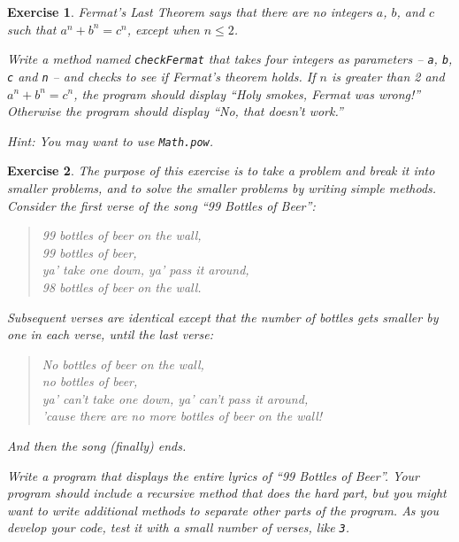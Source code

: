 \documentclass[12pt]{book}
\theoremstyle{exercise}
\newtheorem{exercise}{Exercise}[chapter]
\newcommand{\java}[1]{\verb"#1"}
\begin{document}
\begin{exercise}

Fermat's Last Theorem says that there are no integers $a$, $b$, and $c$ such that $a^n + b^n = c^n$, except when $n \leq 2$.

Write a method named \java{checkFermat} that takes four integers as parameters -- \java{a}, \java{b}, \java{c} and \java{n} -- and checks to see if Fermat's theorem holds.
If $n$ is greater than 2 and $a^n + b^n = c^n$, the program should display ``Holy smokes, Fermat was wrong!''
Otherwise the program should display ``No, that doesn't work.''

Hint: You may want to use \java{Math.pow}.

\end{exercise}


\begin{exercise}

The purpose of this exercise is to take a problem and break it into smaller problems, and to solve the smaller problems by writing simple methods.
Consider the first verse of the song ``99 Bottles of Beer'':

\begin{quote}
99 bottles of beer on the wall,\\
99 bottles of beer,\\
ya' take one down, ya' pass it around,\\
98 bottles of beer on the wall.
\end{quote}

Subsequent verses are identical except that the number of bottles gets smaller by one in each verse, until the last verse:

\begin{quote}
No bottles of beer on the wall,\\
no bottles of beer,\\
ya' can't take one down, ya' can't pass it around,\\
'cause there are no more bottles of beer on the wall!
\end{quote}

And then the song (finally) ends.

Write a program that displays the entire lyrics of ``99 Bottles of Beer''.
Your program should include a recursive method that does the hard part, but you might want to write additional methods to separate other parts of the program.
As you develop your code, test it with a small number of verses, like \java{3}.

\end{exercise}
\end{document}
